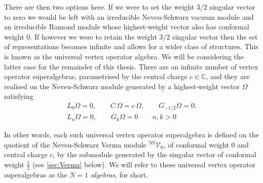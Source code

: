 \documentclass[a4paper,reqno,12pt]{report}
\theoremstyle{definition}
\numberwithin{equation}{section}
\newcommand{\CC}{\mathbb{C}}
\newcommand{\Ver}[1]{\mathcal{V}_{#1}}       %
\newcommand{\hw}{highest-weight}
\newcommand{\sv}{singular vector}
\newcommand{\ns}{Neveu-Schwarz}
\newcommand{\ram}{Ramond}
\theoremstyle{plain}
\newcommand{\hwv}{\hw{} vector}
\newcommand{\NSVer}[1]{{}^{\text{NS}}\Ver{#1}}     %
\begin{document}
There are then two options here. If we were to set the weight $3/2$ singular vector to zero we would be left with an irreducible \ns{} vacuum module and an irreducible \ram{} module whose \hwv{} also has conformal weight $0$. If however we were to retain the weight $3/2$ singular vector then the set of representations becomes infinite and allows for a wider class of structures. This is known as the universal vertex operator algebra. We will be considering the latter case for the remainder of this thesis.  There are an infinite number of vertex operator superalgebras, parametrised by the central charge $c \in \CC$, and they are realised \cite{KacVer94} on the \ns{} module generated by a \hwv{} $\Omega$ satisfying
\begin{equation}
\begin{gathered}
L_0 \Omega = 0, \qquad C \, \Omega = c \, \Omega, \qquad G_{-1/2} \Omega = 0.\\
L_n \Omega = 0, \qquad G_k \Omega = 0 \qquad n,k > 0
\end{gathered}
\end{equation}

In other words, each such universal vertex operator superalgebra is defined on the quotient of the \ns{} Verma module $\NSVer{0}$, of conformal weight $0$ and central charge $c$, by the submodule generated by the \sv{} of conformal weight $\frac{1}{2}$ (see \cref{sec:Verma} below).  We will refer to these universal vertex operator superalgebras as the \emph{$N=1$ algebras}, for short.
\end{document}
